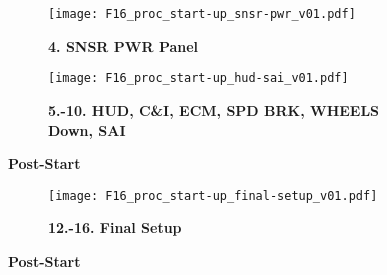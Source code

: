 \begin{figure}[h]
    \centering
    \begin{subfigure}[t]{0.40\linewidth}
        \centering
        \texttt{[image: F16\_proc\_start-up\_snsr-pwr\_v01.pdf]}
        \caption*{\textbf{4. SNSR PWR Panel}}
    \end{subfigure}
    \begin{subfigure}[t]{0.55\linewidth}
        \centering
        \texttt{[image: F16\_proc\_start-up\_hud-sai\_v01.pdf]}
        \caption*{\textbf{5.-10. HUD, C\&I, ECM, SPD BRK, WHEELS Down, SAI}}
    \end{subfigure}
    \caption{\textbf{Post-Start}}
    \label{fig:proc:poststart2}
\end{figure}

\clearpage

\begin{tablenumerate}[resume]
\end{tablenumerate}

\begin{figure}[h]
    \centering
    \begin{subfigure}[t]{0.45\linewidth}
        \centering
        \texttt{[image: F16\_proc\_start-up\_final-setup\_v01.pdf]}
        \caption*{\textbf{12.-16. Final Setup}}
    \end{subfigure}
    \caption{\textbf{Post-Start}}
    \label{fig:proc:poststart2}
\end{figure}



